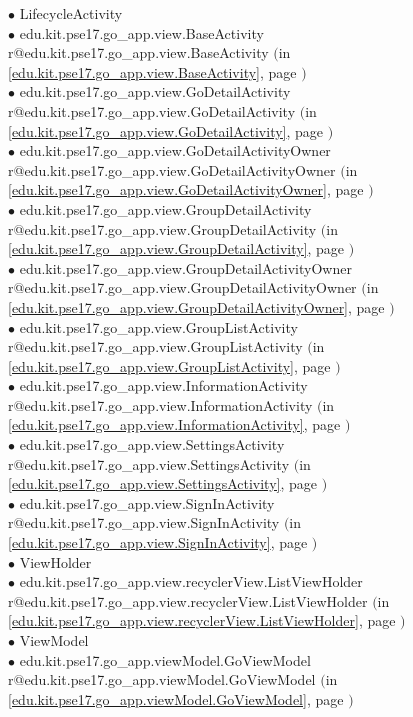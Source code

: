 \documentclass[11pt,a4paper]{article}
\makeatletter
\newcommand{\refdefined}[1]{
\expandafter\ifx\csname r@#1\endcsname\relax
\relax\else
{$($in \ref{#1}, page \pageref{#1}$)$}\fi}
\makeatother
\begin{document}
{{\hspace{1.0cm} $\bullet$ LifecycleActivity {\tiny } \\
\hspace{2.0cm} $\bullet$ edu.kit.pse17.go_app.view.BaseActivity {\tiny \refdefined{edu.kit.pse17.go_app.view.BaseActivity}} \\
\hspace{3.0cm} $\bullet$ edu.kit.pse17.go_app.view.GoDetailActivity {\tiny \refdefined{edu.kit.pse17.go_app.view.GoDetailActivity}} \\
\hspace{4.0cm} $\bullet$ edu.kit.pse17.go_app.view.GoDetailActivityOwner {\tiny \refdefined{edu.kit.pse17.go_app.view.GoDetailActivityOwner}} \\
\hspace{3.0cm} $\bullet$ edu.kit.pse17.go_app.view.GroupDetailActivity {\tiny \refdefined{edu.kit.pse17.go_app.view.GroupDetailActivity}} \\
\hspace{4.0cm} $\bullet$ edu.kit.pse17.go_app.view.GroupDetailActivityOwner {\tiny \refdefined{edu.kit.pse17.go_app.view.GroupDetailActivityOwner}} \\
\hspace{3.0cm} $\bullet$ edu.kit.pse17.go_app.view.GroupListActivity {\tiny \refdefined{edu.kit.pse17.go_app.view.GroupListActivity}} \\
\hspace{3.0cm} $\bullet$ edu.kit.pse17.go_app.view.InformationActivity {\tiny \refdefined{edu.kit.pse17.go_app.view.InformationActivity}} \\
\hspace{3.0cm} $\bullet$ edu.kit.pse17.go_app.view.SettingsActivity {\tiny \refdefined{edu.kit.pse17.go_app.view.SettingsActivity}} \\
\hspace{3.0cm} $\bullet$ edu.kit.pse17.go_app.view.SignInActivity {\tiny \refdefined{edu.kit.pse17.go_app.view.SignInActivity}} \\
\hspace{1.0cm} $\bullet$ ViewHolder {\tiny } \\
\hspace{2.0cm} $\bullet$ edu.kit.pse17.go_app.view.recyclerView.ListViewHolder {\tiny \refdefined{edu.kit.pse17.go_app.view.recyclerView.ListViewHolder}} \\
\hspace{1.0cm} $\bullet$ ViewModel {\tiny } \\
\hspace{2.0cm} $\bullet$ edu.kit.pse17.go_app.viewModel.GoViewModel {\tiny \refdefined{edu.kit.pse17.go_app.viewModel.GoViewModel}} \\
}}
\end{document}
